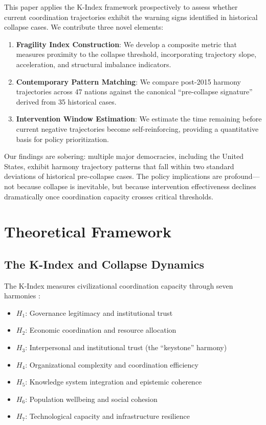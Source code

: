 \documentclass[11pt,a4paper]{article}
\begin{document}
This paper applies the K-Index framework prospectively to assess whether current coordination trajectories exhibit the warning signs identified in historical collapse cases. We contribute three novel elements:

\begin{enumerate}
\item \textbf{Fragility Index Construction}: We develop a composite metric that measures proximity to the collapse threshold, incorporating trajectory slope, acceleration, and structural imbalance indicators.

\item \textbf{Contemporary Pattern Matching}: We compare post-2015 harmony trajectories across 47 nations against the canonical ``pre-collapse signature'' derived from 35 historical cases.

\item \textbf{Intervention Window Estimation}: We estimate the time remaining before current negative trajectories become self-reinforcing, providing a quantitative basis for policy prioritization.
\end{enumerate}

Our findings are sobering: multiple major democracies, including the United States, exhibit harmony trajectory patterns that fall within two standard deviations of historical pre-collapse cases. The policy implications are profound---not because collapse is inevitable, but because intervention effectiveness declines dramatically once coordination capacity crosses critical thresholds.

\section{Theoretical Framework}

\subsection{The K-Index and Collapse Dynamics}

The K-Index measures civilizational coordination capacity through seven harmonies \citep{Paper1}:

\begin{itemize}
\item $H_1$: Governance legitimacy and institutional trust
\item $H_2$: Economic coordination and resource allocation
\item $H_3$: Interpersonal and institutional trust (the ``keystone'' harmony)
\item $H_4$: Organizational complexity and coordination efficiency
\item $H_5$: Knowledge system integration and epistemic coherence
\item $H_6$: Population wellbeing and social cohesion
\item $H_7$: Technological capacity and infrastructure resilience
\end{itemize}
\end{document}
